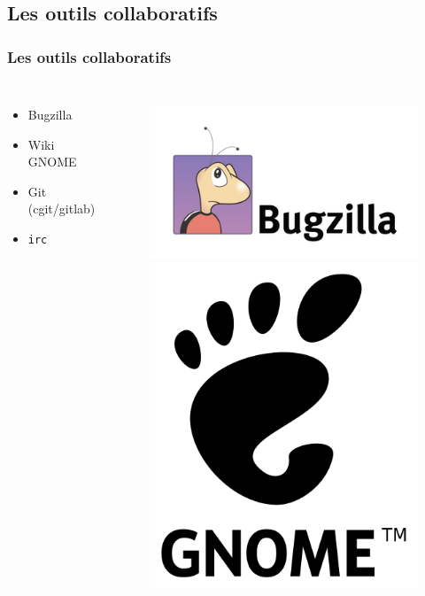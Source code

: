 \documentclass{beamer}
\begin{document}
\subsection{Les outils collaboratifs}
\begin{frame}
  \frametitle{Les outils collaboratifs}
  
  \begin{columns}
    \begin{itemize}
    \item Bugzilla
    \item Wiki GNOME
    \item Git (cgit/gitlab)
    \item \texttt{irc}
    \end{itemize}
    \begin{figure}
      \includegraphics[scale=0.1]{images/bugzilla-logo.png} \\
      \includegraphics[scale=0.04]{images/gnome-logo.png} \\

\end{figure}
\end{columns}
\end{frame}
\end{document}
